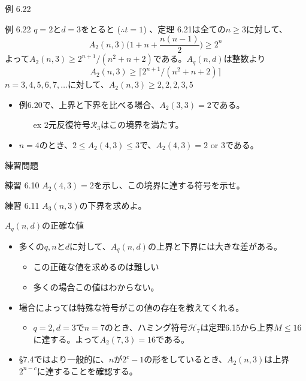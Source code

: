 \documentclass[dvipdfmx,10pt,jsarticle]{beamer}
\begin{document}
  \begin{frame}{例 6.22}
    \begin{block}{例 6.22}
      $q = 2$と$d = 3$をとると ($\therefore t = 1$) 、定理 6.21は全ての$n \geq 3$に対して、
      \[ A_2 (n, 3) \big( 1 + n + \frac{n(n - 1)}{2} \big) \geq 2^n \]
      よって$A_2(n,3) \geq 2^{n+1} / (n^2 + n + 2) $である。$A_q (n, d)$は整数より
      \[A_2 (n, 3) \geq \lceil 2^{n + 1} / (n^2 + n + 2) \rceil \]
      $n = 3, 4, 5, 6, 7, \ldots$に対して、$A_2 (n, 3) \geq 2, 2, 2, 3, 5$
    \end{block}

    \begin{itemize}
      \item 例6.20で、上界と下界を比べる場合、$A_2(3, 3) = 2$である。
        \begin{itemize}
          \item[ex] 2元反復符号$\mathcal{R}_3$はこの境界を満たす。
        \end{itemize}
      \item $n = 4$のとき、$2 \leq A_2 (4, 3) \leq 3$で、$A_2(4, 3) = 2 \text{ or } 3$である。
    \end{itemize}
  \end{frame} 
  \begin{frame}{練習問題}
    \begin{block}{練習 6.10}
      $A_2 (4, 3) = 2$を示し、この境界に達する符号を示せ。
    \end{block}
    
    \vspace{1cm}

    \begin{block}{練習 6.11}
      $A_3 (n, 3)$の下界を求めよ。\\
    \end{block}
  \end{frame}

  \begin{frame}{$A_q (n, d)$の正確な値}
    \begin{itemize}
      \item 多くの$q, n$と$d$に対して、$A_q (n, d)$の上界と下界には大きな差がある。
        \begin{itemize}
          \item この正確な値を求めるのは難しい
          \item 多くの場合この値はわからない。 
        \end{itemize}
      \item 場合によっては特殊な符号がこの値の存在を教えてくれる。
        \begin{itemize}
          \item $q = 2, d = 3$で$n = 7$のとき、ハミング符号$\mathcal{H}_7$は定理6.15から上界$M \leq 16$に達する。よって$A_2 (7, 3) = 16$である。
        \end{itemize}
      \item \S 7.4ではより一般的に、$n$が$2^c - 1$の形をしているとき、$A_2(n, 3)$は上界$2^{n - c}$に達することを確認する。
    \end{itemize}
  \end{frame}
\end{document}

